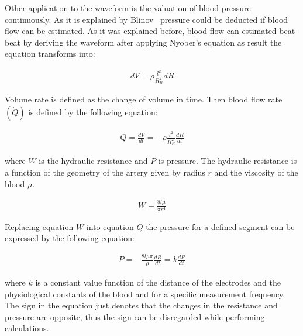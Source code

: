 Other application to the waveform is the valuation of blood pressure continuously. As it is explained by Blinov~\cite{blinov1997plethysmographic} pressure could be deducted if blood flow can be estimated. As it was explained before, blood flow can estimated beat-beat by deriving the waveform after applying Nyober's equation as result the equation transforms into:

\begin{align}
dV = \rho \frac{l^2}{R^2_B} dR
\end{align}

Volume rate is defined as the change of volume in time. Then blood flow rate $(\dot{Q})$ is defined by the following equation:

\begin{align}
\dot{Q} = \frac{dV}{dt}=-\rho \frac{l^2}{R^{2}_{B}} \frac{dR}{dt}
\end{align}

where $W$ is the hydraulic resistance and $P$ is pressure. The hydraulic resistance is a function of the geometry of the artery given by radius $r$ and the viscosity of the blood $\mu$.

\begin{align}
W=\frac{8 l \mu}{\pi r^4}
\end{align}

Replacing equation $W$ into equation $\dot{Q}$ the pressure for a defined segment can be expressed by the following equation:

\begin{align}
P = -\frac{8 l \mu \pi}{\rho} \frac{dR}{dt} = k \frac{dR}{dt}
\end{align}

where $k$ is a constant value function of the distance of the electrodes  and the physiological constants of the blood and for a specific measurement frequency. The sign in the equation just denotes that the changes in the resistance and pressure are opposite, thus the sign can be disregarded while performing calculations.

